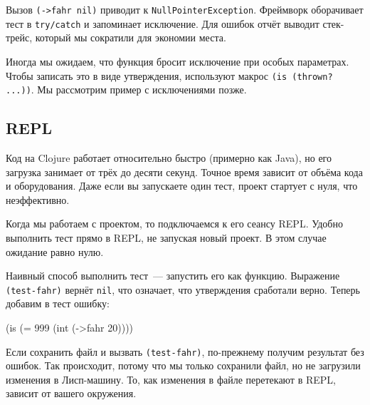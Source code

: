 \begin{english}
\end{english}

\fi


\mnoindent
Вызов \verb|(->fahr nil)| приводит к \texttt{NullPointer\-Exception}. Фреймворк
оборачивает тест в \verb|try/catch| и запоминает исключение. Для ошибок отчёт
выводит стек-трейс, который мы сократили для экономии места.

Иногда мы ожидаем, что функция бросит исключение при особых параметрах. Чтобы
записать это в виде утверждения, используют макрос \verb|(is (thrown? ...))|. Мы
рассмотрим пример с исключениями позже.

\subsection{REPL}


Код на Clojure работает относительно быстро (примерно как Java), но его загрузка
занимает от трёх до десяти секунд. Точное время зависит от объёма кода и
оборудования. Даже если вы запускаете один тест, проект стартует с нуля, что
неэффективно.

Когда мы работаем с проектом, то подключаемся к его сеансу REPL. Удобно
выполнить тест прямо в REPL, не запуская новый проект. В этом случае ожидание
равно нулю.

Наивный способ выполнить тест~--- запустить его как функцию. Выражение
\verb|(test-fahr)| вернёт \verb|nil|, что означает, что утверждения
сработали верно. Теперь добавим в тест ошибку:

\begin{english}
  \begin{clojure}
(is (= 999 (int (->fahr 20))))
  \end{clojure}
\end{english}

Если сохранить файл и вызвать \verb|(test-fahr)|, по-прежнему получим результат
без ошибок. Так происходит, потому что мы только сохранили файл, но не загрузили
изменения в Лисп-машину. То, как изменения в файле перетекают в REPL, зависит от
вашего окружения.

